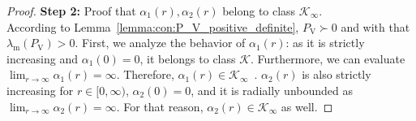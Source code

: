 \begin{proof}
    \textbf{Step 2:} Proof that $\alpha_1(r), \alpha_2(r)$ belong to class $\mathcal{K}_\infty$.\\
    According to Lemma~\ref{lemma:con:P_V_positive_definite}, $P_\mathrm{V} \succ 0$ and with that $\lambda_\mathrm{m}(P_\mathrm{V}) > 0$.
    First, we analyze the behavior of $\alpha_1(r)$: as it is strictly increasing and $\alpha_1(0) = 0$, it belongs to class $\mathcal{K}$. Furthermore, we can evaluate $\lim_{r \rightarrow \infty} \alpha_1(r) = \infty$. Therefore, $\alpha_1(r) \in \mathcal{K}_\infty$~\cite{khalil2002nonlinear}.
    $\alpha_2(r)$ is also strictly increasing for $r \in [0, \infty)$, $\alpha_2(0) = 0$, and it is radially unbounded as $\lim_{r \rightarrow \infty} \alpha_2(r) = \infty$. For that reason, $\alpha_2(r) \in \mathcal{K}_\infty$ as well.
\end{proof}

